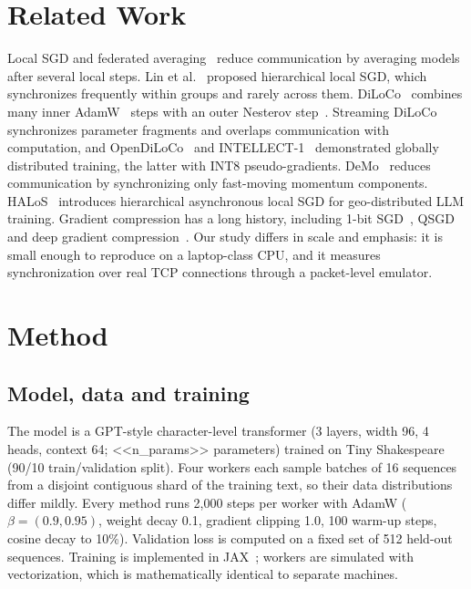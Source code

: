 \documentclass[conference]{IEEEtran}
\begin{document}
\section{Related Work}
Local SGD and federated averaging~\cite{fedavg,stich2019} reduce communication by averaging models after several local steps. Lin et al.~\cite{lin2020} proposed hierarchical local SGD, which synchronizes frequently within groups and rarely across them. DiLoCo~\cite{diloco} combines many inner AdamW~\cite{adamw} steps with an outer Nesterov step~\cite{sutskever2013}. Streaming DiLoCo~\cite{streamingdiloco} synchronizes parameter fragments and overlaps communication with computation, and OpenDiLoCo~\cite{opendiloco} and INTELLECT-1~\cite{intellect1} demonstrated globally distributed training, the latter with INT8 pseudo-gradients. DeMo~\cite{demo} reduces communication by synchronizing only fast-moving momentum components. HALoS~\cite{halos} introduces hierarchical asynchronous local SGD for geo-distributed LLM training. Gradient compression has a long history, including 1-bit SGD~\cite{seide2014}, QSGD~\cite{qsgd} and deep gradient compression~\cite{dgc}. Our study differs in scale and emphasis: it is small enough to reproduce on a laptop-class CPU, and it measures synchronization over real TCP connections through a packet-level emulator.

\section{Method}
\subsection{Model, data and training}
The model is a GPT-style character-level transformer (3 layers, width 96, 4 heads, context 64; <<n_params>> parameters) trained on Tiny Shakespeare~\cite{charrnn} (90/10 train/validation split). Four workers each sample batches of 16 sequences from a disjoint contiguous shard of the training text, so their data distributions differ mildly. Every method runs 2,000 steps per worker with AdamW ($\beta=(0.9,0.95)$, weight decay 0.1, gradient clipping 1.0, 100 warm-up steps, cosine decay to 10\%). Validation loss is computed on a fixed set of 512 held-out sequences. Training is implemented in JAX~\cite{jax}; workers are simulated with vectorization, which is mathematically identical to separate machines.
\end{document}
